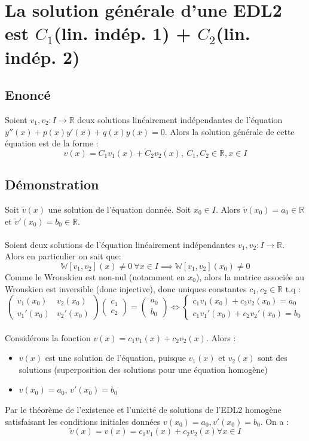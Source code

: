 \documentclass{article}
\begin{document}
\newpage

\section{La solution générale d'une EDL2 est $ C_1 $(lin. indép. 1) + $C_2$(lin. indép. 2)}

\subsection{Enoncé}

Soient $ v_1, v_2 : I \to \mathbb{R} $ deux solutions linéairement indépendantes de l'équation $ y''(x) + p(x)y'(x) + q(x)y(x) = 0 $. Alors la solution générale de cette équation est de la forme :
\[ v(x) = C_1v_1(x) + C_2v_2(x),\ C_1, C_2 \in \mathbb{R}, x \in I \]

\subsection{Démonstration}

Soit $ \tilde{v}(x) $ une solution de l'équation donnée. Soit $ x_0 \in I $. Alors $ \tilde{v}(x_0) = a_0 \in \mathbb{R} $ et $ \tilde{v}'(x_0) = b_0 \in \mathbb{R} $.\\\\
Soient deux solutions de l'équation linéairement indépendantes $ v_1, v_2 : I \to \mathbb{R} $.\\
Alors en particulier on sait que: 
\[ \mathbb{W}[v_1, v_2](x) \neq 0\ \forall x \in I \implies \mathbb{W}[v_1, v_2](x_0) \neq 0 \]
Comme le Wronskien est non-nul (notamment en $x_0$), alors la matrice associée au Wronskien est inversible (donc injective), donc uniques constantes $ c_1, c_2 \in \mathbb{R} $ t.q :
\[ \begin{pmatrix}
v_1(x_0) & v_2(x_0)\\
v_1'(x_0) & v_2'(x_0)
\end{pmatrix}\begin{pmatrix}
c_1 \\
c_2
\end{pmatrix} = \begin{pmatrix}
a_0 \\
b_0
\end{pmatrix} \Leftrightarrow \begin{cases}
    c_1v_1(x_0) + c_2v_2(x_0) = a_0\\
    c_1v_1'(x_0) + c_2v_2'(x_0) = b_0
\end{cases} \]\\
Considérons la fonction $ v(x) = c_1v_1(x) + c_2v_2(x). $ Alors :
\begin{itemize}
    \item $ v(x) $ est une solution de l'équation, puisque $ v_1(x) $ et $ v_2(x) $ sont des solutions (superposition des solutions pour une équation homogène)
    \item $ v(x_0) = a_0 $, $ v'(x_0) = b_0 $
\end{itemize}
Par le théorème de l'existence et l'unicité de solutions de l'EDL2 homogène satisfaisant les conditions initiales données $ v(x_0) = a_0, v'(x_0) = b_0 $. On a :
\[ \tilde{v}(x) = v(x) = c_1v_1(x) + c_2v_2(x) \forall x \in I\] 
\end{document}
